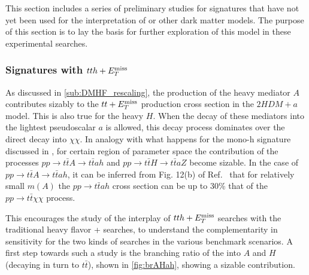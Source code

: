 This section includes a series of preliminary studies for signatures that have not yet been used for the interpretation of \hdma or other dark matter models. The purpose of this section is to lay the basis for further exploration of this model in these experimental searches. 

\subsubsection{Signatures with $tt h+E_T^\mathrm{miss}$}

As discussed in \autoref{sub:DMHF_rescaling}, the production of the heavy mediator $A$ contributes sizably to the $tt+E_T^\mathrm{miss}$  
production cross section in the $2HDM+a$ model. 
This is also true for the heavy $H$. 
When the decay of these mediators into the lightest pseudoscalar $a$ is allowed, this decay process dominates over the direct decay into $\chi\chi$. In analogy with what happens for the mono-h signature discussed in \cite{Bauer:2017ota}, for certain region of parameter space the contribution of the processes $pp \rightarrow t\bar t A \rightarrow t \bar t a h$ and $pp \rightarrow t\bar t H \rightarrow t \bar t a Z$ become sizable. 
In the case of $pp \rightarrow t\bar t A \rightarrow t \bar t a h$, it can be inferred from Fig. 12(b) of Ref.~\cite{Bauer:2017ota} that for relatively small $m(A)$ the $pp \rightarrow t\bar t ah$ cross section can be up to 30\% that of the $pp\rightarrow t \bar t \chi\chi$ process. 

This encourages the study of the interplay of $tth+E_T^\mathrm{miss}$ searches with the traditional heavy flavor + \MET searches, to understand the complementarity in sensitivity for the two kinds of searches in the various benchmark scenarios. A first step towards such a study is the branching ratio of the \hdma into $A$ and $H$ (decaying in turn to $t \bar{t}$), shown in \autoref{fig:brAHah}, showing a sizable contribution. 


